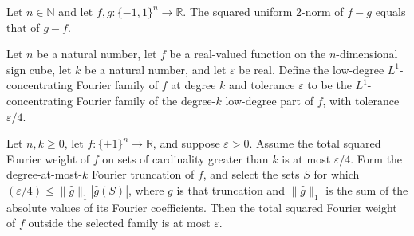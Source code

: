 \begin{theorem}
\label{FABL.uniformLpNorm_sub_sq_comm}
\leanok
{}
Let $n\in\mathbb{N}$ and let $f,g:\{-1,1\}^n\to\mathbb{R}$. The squared uniform $2$-norm
of $f-g$ equals that of $g-f$.
\end{theorem}

\begin{definition}
\label{FABL.lowDegreeL1ConcentratingFourierFamily}
\leanok
{}
Let $n$ be a natural number, let $f$ be a real-valued function on the $n$-dimensional
sign cube, let $k$ be a natural number, and let $\varepsilon$ be real. Define the
low-degree $L^1$-concentrating Fourier family of $f$ at degree $k$ and tolerance
$\varepsilon$ to be the $L^1$-concentrating Fourier family of the degree-$k$ low-degree
part of $f$, with tolerance $\varepsilon/4$.
\end{definition}

\begin{theorem}
\label{FABL.isFourierSpectrumConcentratedOn_lowDegreeL1ConcentratingFourierFamily}
\leanok
{}
Let $n,k\ge 0$, let $f:\{\pm1\}^n\to\mathbb R$, and suppose $\varepsilon>0$. Assume the
total squared Fourier weight of $f$ on sets of cardinality greater than $k$ is at most
$\varepsilon/4$. Form the degree-at-most-$k$ Fourier truncation of $f$, and select the
sets $S$ for which $(\varepsilon/4)\le \|\widehat{g}\|_1|\widehat{g}(S)|$, where $g$ is
that truncation and $\|\widehat{g}\|_1$ is the sum of the absolute values of its Fourier
coefficients. Then the total squared Fourier weight of $f$ outside the selected family
is at most $\varepsilon$.
\end{theorem}

